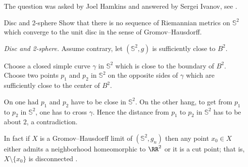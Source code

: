  The question was asked by Joel Hamkins and answered by Sergei Ivanov, see \cite{hamkins}.









\begin{pr}{}{Disc and 2-sphere}\label{2-sphere is far from a ball}
Show that there is no sequence of Riemannian metrics on
$\mathbb{S}^2$ which converge to the unit disc in the sense of Gromov--Hausdorff.
\end{pr}
\textit{Disc and 2-sphere.}
Assume contrary, let $(\mathbb{S}^2,g)$ is sufficiently close to $B^2$.

Choose a closed simple curve $\gamma$ in $\mathbb{S}^2$ which is close to the boundary of $B^2$.
Choose two points $p_1$ and $p_2$ in $\mathbb{S}^2$ 
on the opposite sides of $\gamma$ which are sufficiently close to the center of $B^2$.

On one had $p_1$ and $p_2$ have to be close in $\mathbb{S}^2$.
On the other hang, to get from $p_1$ to $p_2$ in $\mathbb{S}^2$,
one has to cross $\gamma$.
Hence the distance from $p_1$ to $p_2$ in $\mathbb{S}^2$ has to be about $2$,
a contradiction.

In fact if $X$ is a Gromov--Hausdorff limit of $(\mathbb{S}^2,g_n)$
then any point $x_0\in X$ either admits a neighborhood homeomorphic to $\RR^2$ or it is a cut point;
that is, $X\setminus\{x_0\}$ is disconnected \cite[see][3.32]{gromov-MetStr}.








